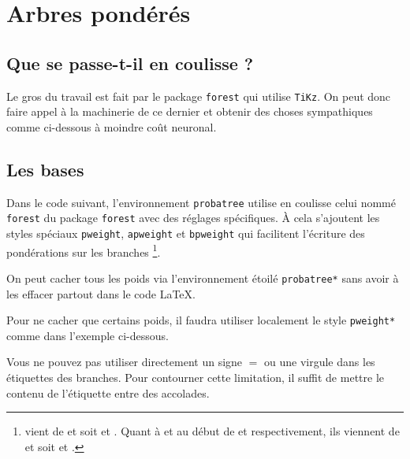 \documentclass[12pt,a4paper]{article}
\begin{document}
\section{Arbres pondérés}

\subsection{Que se passe-t-il en coulisse ?}

Le gros du travail est fait par le package \verb+forest+ qui utilise \verb+TiKz+. On peut donc faire appel à la machinerie de ce dernier et obtenir des choses sympathiques comme ci-dessous à moindre coût neuronal.





\subsection{Les bases}


Dans le code suivant, l'environnement \verb+probatree+ utilise en coulisse celui nommé \verb+forest+ du package \verb+forest+ avec des réglages spécifiques.
À cela s'ajoutent les styles spéciaux \verb+pweight+, \verb+apweight+ et \verb+bpweight+ qui facilitent l'écriture des pondérations sur les branches
\footnote{
     vient de  et  soit  et .
    Quant à  et  au début de  et  respectivement, ils viennent de  et  soit  et .
}.






On peut cacher tous les poids via l'environnement étoilé \verb+probatree*+ sans avoir à les effacer partout dans le code \LaTeX.






Pour ne cacher que certains poids, il faudra utiliser localement le style \verb+pweight*+ comme dans l'exemple ci-dessous.






Vous ne pouvez pas utiliser directement un signe $=$ ou une virgule dans les étiquettes des branches.
Pour contourner cette limitation, il suffit de mettre le contenu de l'étiquette entre des accolades.

\end{document}
